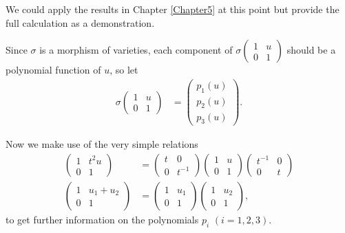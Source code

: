 								We could apply the results in Chapter \ref{Chapter5} at this point but provide the full calculation as a demonstration.

								Since $\sigma$ is a morphism of varieties, each component of $\sigma\left(\begin{matrix} 1& u \\ 0 & 1\end{matrix}\right)$ should be a polynomial function of $u$, so let
								\begin{align*}
								\sigma\left(\begin{matrix} 1& u \\ 0 & 1\end{matrix}\right) &=
								\left(\begin{matrix} p_1(u) \\ p_2(u) \\ p_3(u) \end{matrix}\right).
								\end{align*}

								Now we make use of the very simple relations
								\begin{align}
								\label{eq:no1a}
								\left(\begin{matrix} 1 & t^2u \\ 0 & 1\end{matrix}\right) &=
\left(\begin{matrix} t & 0 \\ 0 & t^{-1}  \end{matrix}\right) 
\left(\begin{matrix} 1 & u \\ 0 & 1 \end{matrix}\right) 
	\left(\begin{matrix}  t^{-1} & 0 \\ 0 & t \end{matrix}\right) \\
		\label{eq:no2a}
		\left(\begin{matrix} 1 & u_1 + u_2 \\ 0 & 1 \end{matrix}\right) &=
\left(\begin{matrix} 1 & u_1 \\ 0 & 1 \end{matrix}\right) 
	\left(\begin{matrix} 1 & u_2 \\ 0 & 1 \end{matrix}\right),
	\end{align}
	to get further information on the polynomials $p_i$ $(i=1,2,3)$.

